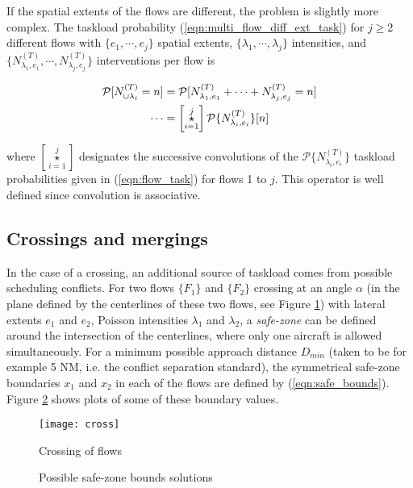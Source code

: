 \documentclass[conference]{IEEEtran}
\begin{document}
If the spatial extents of the flows are different, the problem is slightly more complex. The taskload probability (\ref{eqn:multi_flow_diff_ext_task}) for $j\ge2$ different flows with $\{e_1, \cdots, e_j\}$ spatial extents, $\{\lambda_1, \cdots, \lambda_j\}$ intensities, and $\{N_{\lambda_1,e_1}^{(T)},\cdots, N_{\lambda_j,e_j}^{(T)}\}$ interventions per flow is

\begin{align}
\mathcal P[N^{(T)}_{\cup\lambda_i}=n]&= \mathcal P[N_{\lambda_1,e_1}^{(T)}+\cdots+N_{\lambda_j,e_j}^{(T)}=n]\notag\\
\cdots&=\left[\displaystyle\mathop{\star}\limits_{i=1}^j\right]\mathcal P\{N_{\lambda_i,e_i}^{(T)}\}[n]	\label{eqn:multi_flow_diff_ext_task}
\end{align}

where $\left[\displaystyle\mathop{\star}\limits_{i=1}^j\right]$ designates the successive convolutions of the $\mathcal P\{N_{\lambda_i,e_i}^{(T)}\}$ taskload probabilities given in (\ref{eqn:flow_task}) for flows 1 to $j$. This operator is well defined since convolution is associative.

\subsection{Crossings and mergings}

In the case of a crossing, an additional source of taskload comes from possible scheduling conflicts. For two flows $\{F_1\}$ and $\{F_2\}$ crossing at an angle $\alpha$ (in the plane defined by the centerlines of these two flows, see Figure \ref{fig:cross}) with lateral extents $e_1$ and $e_2$, Poisson intensities $\lambda_1$ and $\lambda_2$, a \emph{safe-zone} can be defined around the intersection of the centerlines, where only one aircraft is allowed simultaneously. For a minimum possible approach distance $D_{min}$ (taken to be for example 5 NM, i.e. the conflict separation standard), the symmetrical safe-zone boundaries $x_1$ and $x_2$ in each of the flows are defined by (\ref{eqn:safe_bounds}). Figure \ref{fig:safe_bounds} shows plots of some of these boundary values.

\begin{figure}[!h]
\centering
\texttt{[image: cross]}
\caption{Crossing of flows}
\label{fig:cross}
\end{figure}

\begin{figure}[!h]
\centering
{}
\caption{Possible safe-zone bounds solutions}
\label{fig:safe_bounds}
\end{figure}
\end{document}
